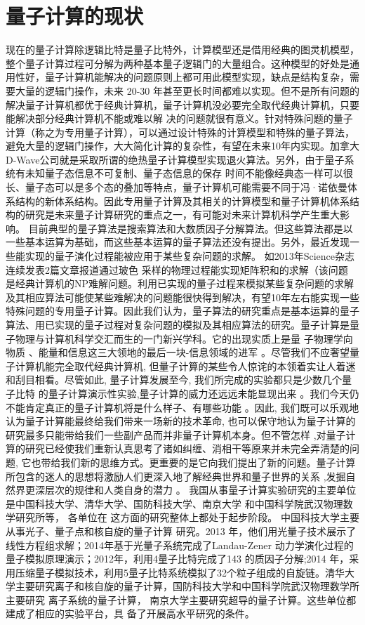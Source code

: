 \documentclass{article}
\begin{document}
\section{量子计算的现状}
现在的量子计算除逻辑比特是量子比特外，计算模型还是借用经典的图灵机模型，整个量子计算过程可分解为两种基本量子逻辑门的大量组合。这种模型的好处是通用性好，量子计算机能解决的问题原则上都可用此模型实现，缺点是结构复杂，需要大量的逻辑门操作，未来 20-30 年甚至更长时间都难以实现。但不是所有问题的解决量子计算机都优于经典计算机，量子计算机没必要完全取代经典计算机，只要能解决部分经典计算机不能或难以解 决的问题就很有意义。针对特殊问题的量子计算（称之为专用量子计算），可以通过设计特殊的计算模型和特殊的量子算法，避免大量的逻辑门操作，大大简化计算的复杂性，有望在未来10年内实现。加拿大D-Wave公司就是采取所谓的绝热量子计算模型实现退火算法。另外，由于量子系统有未知量子态信息不可复制、量子态信息的保存 时间不能像经典态一样可以很长、量子态可以是多个态的叠加等特点，量子计算机可能需要不同于冯·诺依曼体系结构的新体系结构。因此专用量子计算及其相关的计算模型和量子计算机体系结构的研究是未来量子计算研究的重点之一，有可能对未来计算机科学产生重大影响。
\newline
目前典型的量子算法是搜索算法和大数质因子分解算法。但这些算法都是以一些基本运算为基础，而这些基本运算的量子算法还没有提出。另外，最近发现一些能实现的量子演化过程能被应用于某些复杂问题的求解。 如2013年Science杂志连续发表2篇文章报道通过玻色 采样的物理过程能实现矩阵积和的求解（该问题 是经典计算机的NP难解问题。利用已实现的量子过程来模拟某些复杂问题的求解及其相应算法可能使某些难解决的问题能很快得到解决，有望10年左右能实现一些特殊问题的专用量子计算。因此我们认为，量子算法的研究重点是基本运算的量子算法、用已实现的量子过程对复杂问题的模拟及其相应算法的研究。量子计算是量子物理与计算机科学交汇而生的一门新兴学科。它的出现实质上是量 子物理学向物质 、能量和信息这三大领地的最后一块-信息领域的进军 。尽管我们不应奢望量子计算机能完全取代经典计算机, 但量子计算的某些令人惊诧的本领着实让人着迷 和刮目相看。尽管如此, 量子计算发展至今, 我们所完成的实验都只是少数几个量子比特 的量子计算演示性实验,量子计算的威力还远远未能显现出来 。我们今天仍不能肯定真正的量子计算机将是什么样子、有哪些功能 。因此, 我们既可以乐观地认为量子计算能最终给我们带来一场新的技术革命, 也可以保守地认为量子计算的研究最多只能带给我们一些副产品而并非量子计算机本身。但不管怎样 ,对量子计算的研究已经使我们重新认真思考了诸如纠缠、消相干等原来并未完全弄清楚的问题, 它也带给我们新的思维方式。更重要的是它向我们提出了新的问题。量子计算所包含的迷人的思想将激励人们更深入地了解经典世界和量子世界的关系 ,发掘自然界更深层次的规律和人类自身的潜力 。
\newline
我国从事量子计算实验研究的主要单位是中国科技大学、清华大学、国防科技大学、南京大学 和中国科学院武汉物理数学研究所等， 各单位在 这方面的研究整体上都处于起步阶段。 中国科技大学主要从事光子、量子点和核自旋的量子计算 研究。2013 年，他们用光量子技术展示了线性方程组求解；2014年基于光量子系统完成了Landau-Zener 动力学演化过程的量子模拟原理演示；2012年，利用4量子比特完成了143 的质因子分解;2014 年，采用压缩量子模拟技术，利用5量子比特系统模拟了32个粒子组成的自旋链。清华大学主要研究离子和核自旋的量子计算，国防科技大学和中国科学院武汉物理数学所主要研究 离子系统的量子计算，
南京大学主要研究超导的量子计算。这些单位都建成了相应的实验平台，具 备了开展高水平研究的条件。
\end{document}
